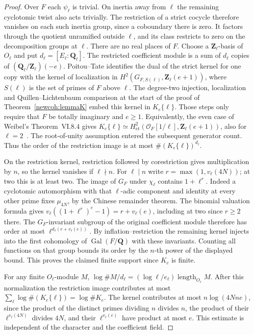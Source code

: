 \begin{proof}
Over \(F\) each \(\psi_\ell\) is trivial. On inertia away from \(\ell\)
the remaining cyclotomic twist also acts trivially. The restriction
of a strict cocycle therefore vanishes on each such inertia group,
since a coboundary there is zero. It factors through the quotient
unramified outside \(\ell\), and its class restricts to zero on the
decomposition groups at \(\ell\). There are no real places of \(F\).
Choose a \(\mathbf Z_\ell\)-basis of \(O_\ell\) and put
\(d_\ell=[E_\ell:\mathbf Q_\ell]\). The restricted coefficient module
is a sum of \(d_\ell\) copies of \((\mathbf Q_\ell/\mathbf Z_\ell)(-e)\).
Poitou--Tate identifies the dual of the strict kernel for one copy
with the kernel of localization in
\(H^2(G_{F,S(\ell)},\mathbf Z_\ell(e+1))\), where \(S(\ell)\)
is the set of primes of \(F\) above \(\ell\).
The degree-two injection, localization and Quillen--Lichtenbaum
comparison at the start of the proof of Theorem~\ref{newcoh:lemmaK}
embed this kernel in \(K_e\{\ell\}\). Those steps only require that
\(F\) be totally imaginary and \(e\ge1\). Equivalently, the even
case of Weibel's Theorem~VI.8.4 gives
\(K_e\{\ell\}\simeq H^2_{\mathrm{et}}(\mathcal O_F[1/\ell],
\mathbf Z_\ell(e+1))\), also for \(\ell=2\)~\cite{weibelKbook}.
The root-of-unity assumption entered the subsequent generator count.
Thus the order of the restriction image is at most
\(\#(K_e\{\ell\})^{d_\ell}\).

On the restriction kernel, restriction followed by corestriction
gives multiplication by \(n\), so the kernel vanishes if
\(\ell\nmid n\). For \(\ell\mid n\) write
\(r=\max(1,v_\ell(4N))\); at two this is at least two.
The image of \(G_F\) under \(\chi_\ell\) contains \(1+\ell^r\).
Indeed a cyclotomic automorphism with that \(\ell\)-adic component
and identity at every other prime fixes \(\mu_{4N}\), by the Chinese
remainder theorem. The binomial valuation formula gives
\(v_\ell((1+\ell^r)^e-1)=r+v_\ell(e)\), including at two since
\(r\ge2\) there. The \(G_F\)-invariant subgroup of the original
coefficient module therefore has order at most
\(\ell^{d_\ell(r+v_\ell(e))}\).
By inflation--restriction the remaining kernel injects into the
first cohomology of \(\operatorname{Gal}(F/\mathbf Q)\) with these
invariants. Counting all functions on that group bounds its order
by the \(n\)-th power of the displayed bound. This proves the claimed
finite support since \(K_e\) is finite.

For any finite \(O_\ell\)-module \(M\),
\(\log\#M/d_\ell=(\log\ell/e_\ell)\operatorname{length}_{O_\ell} M\).
After this normalization the restriction image contributes at most
\(\sum_\ell\log\#(K_e\{\ell\})=\log\#K_e\).
The kernel contributes at most \(n\log(4Nne)\), since the product
of the distinct primes dividing \(n\) divides \(n\), the product
of their \(\ell^{v_\ell(4N)}\) divides \(4N\), and their
\(\ell^{v_\ell(e)}\) have product at most \(e\). This estimate
is independent of the character and the coefficient field.
\end{proof}

